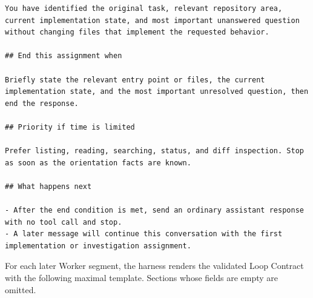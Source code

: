 \begin{lstlisting}[style=looparenaprompt]
You have identified the original task, relevant repository area, current implementation state, and most important unanswered question without changing files that implement the requested behavior.

## End this assignment when

Briefly state the relevant entry point or files, the current implementation state, and the most important unresolved question, then end the response.

## Priority if time is limited

Prefer listing, reading, searching, status, and diff inspection. Stop as soon as the orientation facts are known.

## What happens next

- After the end condition is met, send an ordinary assistant response with no tool call and stop.
- A later message will continue this conversation with the first implementation or investigation assignment.
\end{lstlisting}

For each later Worker segment, the harness renders the validated Loop Contract with the following maximal template. Sections whose fields are empty are omitted.

